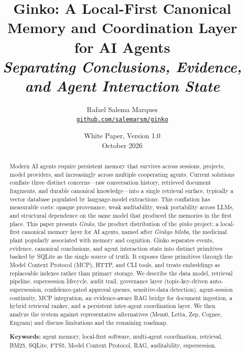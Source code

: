 \documentclass[11pt,a4paper]{article}
\title{
 \vspace{-1.5em}
 {\Huge\bfseries Ginko: A Local-First Canonical Memory and Coordination Layer for AI Agents}\\[0.6em]
 {\large\itshape Separating Conclusions, Evidence, and Agent Interaction State}
}
\author{
 Rafael Salema Marques\\
 \href{https://github.com/salemarsm/ginko}{\texttt{github.com/salemarsm/ginko}}
}
\date{White Paper, Version 1.0\\October 2026}
\begin{document}
\maketitle
\thispagestyle{fancy}

\begin{abstract}
\noindent
Modern AI agents require persistent memory that survives across sessions, projects, model providers, and increasingly across multiple cooperating agents. Current solutions conflate three distinct concerns---raw conversation history, retrieved document fragments, and durable canonical knowledge---into a single retrieval surface, typically a vector database populated by language-model extractions. This conflation has measurable costs: opaque provenance, weak auditability, weak portability across LLMs, and structural dependence on the same model that produced the memories in the first place. This paper presents \textit{Ginko}, the product distribution of the \textit{ginko} project: a local-first canonical memory layer for AI agents, named after \textit{Ginkgo biloba}, the medicinal plant popularly associated with memory and cognition. Ginko separates events, evidence, canonical conclusions, and agent interaction state into distinct primitives backed by SQLite as the single source of truth. It exposes these primitives through the Model Context Protocol (MCP), HTTP, and CLI tools, and treats embeddings as replaceable indexes rather than primary storage. We describe the data model, retrieval pipeline, supersession lifecycle, audit trail, governance layer (topic-key-driven auto-supersession, confidence-gated approval queues, sensitive-data detection), agent-session continuity, MCP integration, an evidence-aware RAG bridge for document ingestion, a hybrid retrieval ranker, and a persistent inter-agent coordination layer. We then analyze the system against representative alternatives (Mem0, Letta, Zep, Cognee, Engram) and discuss limitations and the remaining roadmap.

\vspace{0.6em}
\noindent\textbf{Keywords:} agent memory, local-first software, multi-agent coordination, retrieval, BM25, SQLite, FTS5, Model Context Protocol, RAG, auditability, supersession.
\end{abstract}

\vspace{1em}

\end{document}
